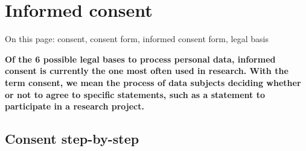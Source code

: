 \documentclass[
]{book}
\begin{document}
\hypertarget{informed-consent-forms}{%
\section{Informed consent}\label{informed-consent-forms}}

On this page: consent, consent form, informed consent form, legal basis

\textbf{Of the 6 possible legal bases to process personal data, informed consent is
currently the one most often used in research. With the term consent, we mean
the process of data subjects deciding whether or not to agree to specific
statements, such as a statement to participate in a research project.}

\hypertarget{consent-step-by-step}{%
\subsection{Consent step-by-step}\label{consent-step-by-step}}
\end{document}
